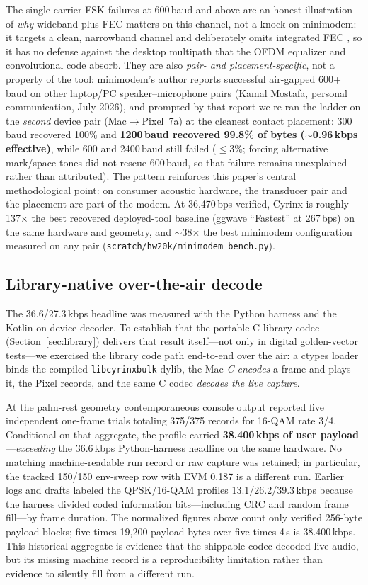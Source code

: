 \documentclass[11pt]{article}
\begin{document}
The single-carrier FSK failures at 600\,baud and above are an honest
illustration of \emph{why} wideband-plus-FEC matters on this channel, not a
knock on minimodem: it targets a clean, narrowband channel and deliberately
omits integrated FEC \cite{minimodemissue}, so it has no defense against the
desktop multipath that the OFDM equalizer and convolutional code absorb.
They are also \emph{pair- and placement-specific}, not a property of the
tool: minimodem's author reports successful air-gapped 600+\,baud on other
laptop/PC speaker--microphone pairs (Kamal Mostafa, personal communication,
July 2026), and prompted by that report we re-ran the ladder on the
\emph{second} device pair (Mac$\rightarrow$Pixel~7a) at the cleanest
contact placement: 300\,baud recovered 100\% and \textbf{1200\,baud
recovered 99.8\% of bytes ($\sim$0.96\,kbps effective)}, while 600 and
2400\,baud still failed ($\le$3\%; forcing alternative mark/space tones did
not rescue 600\,baud, so that failure remains unexplained rather than
attributed). The pattern reinforces this paper's central methodological
point: on consumer acoustic hardware, the transducer pair and the placement
are part of the modem. At 36{,}470\,bps verified, Cyrinx is roughly
137$\times$ the best recovered deployed-tool baseline (ggwave ``Fastest''
at 267\,bps) on the same hardware and geometry, and $\sim$38$\times$ the
best minimodem configuration measured on any pair
(\texttt{scratch/hw20k/minimodem\_bench.py}).

\subsection{Library-native over-the-air decode}
\label{sec:libota}

The 36.6/27.3\,kbps headline was measured with the Python harness and the Kotlin
on-device decoder. To establish that the portable-C library codec
(Section~\ref{sec:library}) delivers that result itself---not only in digital
golden-vector tests---we exercised the library code path end-to-end over the air:
a ctypes loader binds the compiled \texttt{libcyrinxbulk} dylib, the Mac
\emph{C-encodes} a frame and plays it, the Pixel records, and the same C codec
\emph{decodes the live capture}.

At the palm-rest geometry contemporaneous console output reported five
independent one-frame trials totaling 375/375 records for 16-QAM rate 3/4.
Conditional on that aggregate, the profile carried \textbf{38.400\,kbps of
user payload}---\emph{exceeding} the 36.6\,kbps Python-harness headline on the
same hardware. No matching machine-readable run record or raw capture was
retained; in particular, the tracked 150/150 env-sweep row with EVM 0.187 is a
different run. Earlier logs and drafts labeled the QPSK/16-QAM profiles
13.1/26.2/39.3\,kbps because the harness
divided coded information bits---including CRC and random frame fill---by frame
duration. The normalized figures above count only verified 256-byte payload
blocks; five times 19{,}200 payload bytes over five times 4\,s is 38.400\,kbps.
This historical aggregate is evidence that the shippable codec decoded live
audio, but its missing machine record is a reproducibility limitation rather
than evidence to silently fill from a different run.
\end{document}
